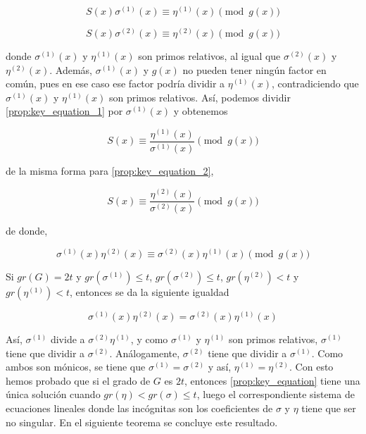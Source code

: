 \begin{equation}
    \label{prop:key_equation_1}
    S(x) \sigma^{(1)}(x) \equiv \eta^{(1)}(x) \pmod{g(x)}
\end{equation}

\begin{equation}
    \label{prop:key_equation_2}
    S(x) \sigma^{(2)}(x) \equiv \eta^{(2)}(x) \pmod{g(x)}
\end{equation}

donde $\sigma^{(1)}(x)$ y $\eta^{(1)}(x)$ son primos relativos, al igual que $\sigma^{(2)}(x)$ y $\eta^{(2)}(x)$. Además, $\sigma^{(1)}(x)$ y $g(x)$ no pueden tener ningún factor en común, pues en ese caso ese factor podría dividir a $\eta^{(1)}(x)$, contradiciendo que $\sigma^{(1)}(x)$ y $\eta^{(1)}(x)$ son primos relativos. Así, podemos dividir \ref{prop:key_equation_1} por $\sigma^{(1)}(x)$ y obtenemos

$$S(x) \equiv \frac{\eta^{(1)}(x)}{\sigma^{(1)}(x)} \pmod{g(x)}$$

de la misma forma para \ref{prop:key_equation_2},

$$S(x) \equiv \frac{\eta^{(2)}(x)}{\sigma^{(2)}(x)} \pmod{g(x)}$$

de donde,

\begin{equation}
    \label{prop:key_equation_12}
    \sigma^{(1)}(x) \eta^{(2)}(x) \equiv \sigma^{(2)}(x) \eta^{(1)}(x) \pmod{g(x)}
\end{equation}

Si $gr(G) = 2t$ y $gr(\sigma^{(1)}) \leq t$, $gr(\sigma^{(2)}) \leq t$, $gr(\eta^{(2)}) < t$ y $gr(\eta^{(1)}) < t$, entonces se da la siguiente igualdad

\begin{equation}
    \label{prop:key_equation_caso1}
    \sigma^{(1)}(x) \eta^{(2)}(x) = \sigma^{(2)}(x) \eta^{(1)}(x)
\end{equation}

Así, $\sigma^{(1)}$ divide a $\sigma^{(2)} \eta^{(1)}$, y como $\sigma^{(1)}$ y $\eta^{(1)}$ son primos relativos, $\sigma^{(1)}$ tiene que dividir a $\sigma^{(2)}$. Análogamente, $\sigma^{(2)}$ tiene que dividir a $\sigma^{(1)}$. Como ambos son mónicos, se tiene que $\sigma^{(1)} = \sigma^{(2)}$ y así, $\eta^{(1)} = \eta^{(2)}$. Con esto hemos probado que si el grado de $G$ es $2t$, entonces \ref{prop:key_equation} tiene una única solución cuando $gr(\eta) < gr(\sigma) \leq t$, luego el correspondiente sistema de ecuaciones lineales donde las incógnitas son los coeficientes de $\sigma$ y $\eta$ tiene que ser no singular. En el siguiente teorema se concluye este resultado.

